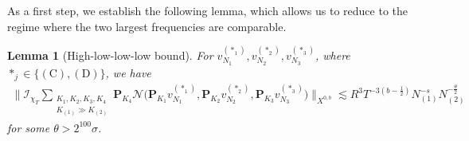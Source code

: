 \documentclass[11pt,reqno,english]{amsart}
\numberwithin{equation}{section}
\theoremstyle{plain}
\newtheorem{lemma}[theorem]{Lemma}
\theoremstyle{definition}
\theoremstyle{remark}
\begin{document}
As a first step, we establish the following lemma, which allows us to reduce to the regime where the two largest frequencies are comparable.

\begin{lemma}[High-low-low-low bound]\label{lem:highlowlowlow}
	For $v_{N_1}^{(\ast_1)},v_{N_2}^{(\ast_2)},v_{N_3}^{(\ast_3)}$, where $\ast_j\in\{(\mathrm{C}),(\mathrm{D})\}$, we have
	\begin{align*}
		\Big\|\mathcal{I}_{\chi_T}\sum_{\substack{K_1,K_2,K_3,K_4 \\
				K_{(1)}\gg K_{(2)}
		}}\mathbf{P}_{K_4}\mathcal{N}\big(\mathbf{P}_{K_1} v_{N_1}^{(\ast_1)},
		\mathbf{P}_{K_2}v_{N_2}^{(\ast_2)},
		\mathbf{P}_{K_3}v_{N_3}^{(\ast_3)}
		\big)\Big\|_{X^{0,b}}\lesssim R^3 T^{-3(b-\frac{1}{2})}N_{(1)}^{-s}N_{(2)}^{-\frac{\theta}{2}}
	\end{align*}
	for some $\theta>2^{100}\sigma$.
\end{lemma}
\end{document}
